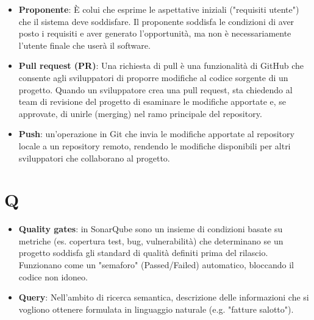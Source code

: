 \documentclass[a4paper,12pt]{article}
\begin{document}
\begin{itemize}
    \item \textbf{Proponente}: È colui che esprime le aspettative iniziali ("requisiti utente") che il sistema deve soddisfare. Il proponente soddisfa le condizioni di aver posto i requisiti e aver generato l'opportunità, ma non è necessariamente l'utente finale che userà il software.
    \item \textbf{Pull request (PR)}: Una richiesta di pull è una funzionalità di GitHub che consente agli sviluppatori di proporre modifiche al codice sorgente di un progetto. Quando un sviluppatore crea una pull request, sta chiedendo al team di revisione del progetto di esaminare le modifiche apportate e, se approvate, di unirle (merging) nel ramo principale del repository.
    \item \textbf{Push}: un'operazione in Git che invia le modifiche apportate al repository locale a un repository remoto, rendendo le modifiche disponibili per altri sviluppatori che collaborano al progetto.
\end{itemize}
\section{Q}
\begin{itemize}
    \item \textbf{Quality gates}: in SonarQube sono un insieme di condizioni basate su metriche (es. copertura test, bug, vulnerabilità) che determinano se un progetto soddisfa gli standard di qualità definiti prima del rilascio. Funzionano come un "semaforo" (Passed/Failed) automatico, bloccando il codice non idoneo.
    \item \textbf{Query}: Nell'ambito di ricerca semantica, descrizione delle informazioni che si vogliono ottenere formulata in linguaggio naturale (e.g. "fatture salotto").
\end{itemize}
\end{document}
